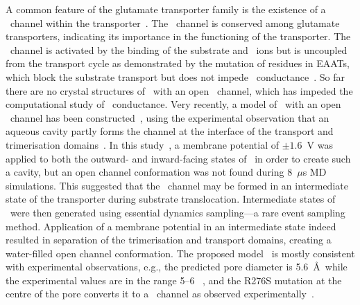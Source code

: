 A common feature of the glutamate transporter family is the existence of a 
\Cl\ channel within the transporter~\cite{Vandenberg2013}. The \Cl\ channel 
is conserved among glutamate transporters, indicating its importance in the 
functioning of the transporter. The \Cl\ channel is activated by the binding 
of the substrate and \Na\ ions but is uncoupled from the transport cycle as 
demonstrated by the mutation of residues in EAATs, which block the substrate 
transport but does not impede \Cl\ conductance~\cite{Fairman1995}. So far 
there are no crystal structures of \GltPh\ with an open \Cl\ channel, which 
has impeded the computational study of \Cl\ conductance. Very recently, a model 
of \GltPh\ with an open \Cl\ channel has been constructed~\cite{Machtens2015}, 
using the experimental observation that an aqueous cavity partly forms the 
channel at the interface of the transport and trimerisation domains~\cite{Cater2014}. 
In this study~\cite{Machtens2015}, a membrane potential of 
$\pm 1.6$~V was applied to both the outward- and inward-facing states of 
\GltPh\ in order to create such a cavity, but an open channel conformation 
was not found during 8~$\mu$s MD simulations. This suggested that the \Cl\ 
channel may be formed in an intermediate state of the transporter during 
substrate translocation. Intermediate states of \GltPh\ were then generated 
using essential dynamics sampling---a rare event sampling method. Application 
of a membrane potential in an intermediate state indeed resulted in separation 
of the trimerisation and transport domains, creating a water-filled open channel 
conformation. The proposed model~\cite{Machtens2015} is mostly consistent with 
experimental observations, e.g., the predicted pore diameter is 5.6~\AA\ while 
the experimental values are in the range 5--6 \angs~\cite{Vandenberg2013}, and 
the R276S mutation at the centre of the pore converts it to a \Na\ channel as 
observed experimentally~\cite{Borre2004b}.

